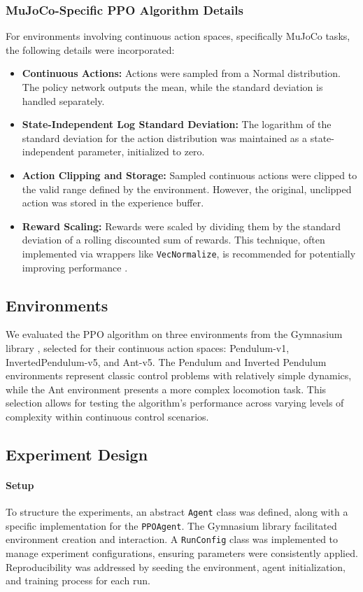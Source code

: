 \documentclass{article}
\begin{document}
\subsubsection{MuJoCo-Specific PPO Algorithm Details}
For environments involving continuous action spaces, specifically MuJoCo tasks, the following details were incorporated:
\begin{itemize}
    \item \textbf{Continuous Actions:} Actions were sampled from a Normal distribution. The policy network outputs the mean, while the standard deviation is handled separately.
    \item \textbf{State-Independent Log Standard Deviation:} The logarithm of the standard deviation for the action distribution was maintained as a state-independent parameter, initialized to zero.
    \item \textbf{Action Clipping and Storage:} Sampled continuous actions were clipped to the valid range defined by the environment. However, the original, unclipped action was stored in the experience buffer.
    \item \textbf{Reward Scaling:} Rewards were scaled by dividing them by the standard deviation of a rolling discounted sum of rewards. This technique, often implemented via wrappers like \texttt{VecNormalize}, is recommended for potentially improving performance \cite{Engstrom2020Implementation}.
\end{itemize}

\subsection{Environments}
We evaluated the PPO algorithm on three environments from the Gymnasium library \cite{towers2024gymnasium}, selected for their continuous action spaces: Pendulum-v1, InvertedPendulum-v5, and Ant-v5. The Pendulum and Inverted Pendulum environments represent classic control problems with relatively simple dynamics, while the Ant environment presents a more complex locomotion task. This selection allows for testing the algorithm's performance across varying levels of complexity within continuous control scenarios.

\subsection{Experiment Design}

\paragraph{Setup}
To structure the experiments, an abstract \texttt{Agent} class was defined, along with a specific implementation for the \texttt{PPOAgent}. The Gymnasium library facilitated environment creation and interaction. A \texttt{RunConfig} class was implemented to manage experiment configurations, ensuring parameters were consistently applied. Reproducibility was addressed by seeding the environment, agent initialization, and training process for each run.
\end{document}

